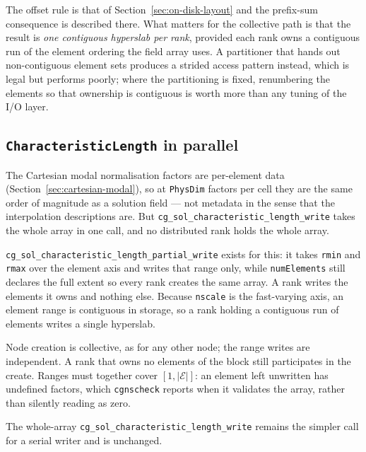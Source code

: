 \documentclass[11pt,letterpaper]{article}
\newif\ifvfourdraft
\newenvironment{v4block}{\ifvfourdraft\color{v4violet}\fi\ignorespaces}{\par}
\begin{document}
\begin{v4block}
The offset rule is that of Section~\ref{sec:on-disk-layout} and the prefix-sum
consequence is described there.  What matters for the collective path is that the
result is \emph{one contiguous hyperslab per rank}, provided each rank owns a
contiguous run of the element ordering the field array uses.  A partitioner that
hands out non-contiguous element sets produces a strided access pattern instead,
which is legal but performs poorly; where the partitioning is fixed, renumbering
the elements so that ownership is contiguous is worth more than any tuning of the
I/O layer.

\subsection{\texttt{CharacteristicLength} in parallel}

The Cartesian modal normalisation factors are per-element data
(Section~\ref{sec:cartesian-modal}), so at \texttt{PhysDim} factors per cell they
are the same order of magnitude as a solution field --- not metadata in the
sense that the interpolation descriptions are.  But
\texttt{cg\_sol\_characteristic\_length\_write} takes the whole array in one
call, and no distributed rank holds the whole array.

\texttt{cg\_sol\_characteristic\_length\_partial\_write} exists for this: it takes
\texttt{rmin} and \texttt{rmax} over the element axis and writes that range only,
while \texttt{numElements} still declares the full extent so every rank creates
the same array.  A rank writes the elements it owns and nothing else.  Because
\texttt{nscale} is the fast-varying axis, an element range is contiguous in
storage, so a rank holding a contiguous run of elements writes a single
hyperslab.

Node creation is collective, as for any other node; the range writes are
independent.  A rank that owns no elements of the block still participates in
the create.  Ranges must together cover $[1, |\mathcal{E}|]$: an element left
unwritten has undefined factors, which \texttt{cgnscheck} reports when it
validates the array, rather than silently reading as zero.

The whole-array \texttt{cg\_sol\_characteristic\_length\_write} remains the
simpler call for a serial writer and is unchanged.

\end{v4block}
\end{document}
